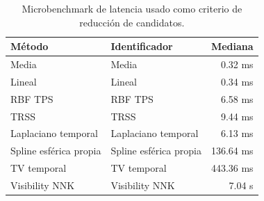 \begin{table}[htbp]
\centering
\small
\caption{Microbenchmark de latencia usado como criterio de reducción de candidatos.}
\label{tab:ch4_runtime_screening_summary}
\begin{tabular}{@{}p{4.0cm}p{3.3cm}r@{}}
\toprule
Método & Identificador & Mediana \\
\midrule
Media & Media & 0.32 ms \\
Lineal & Lineal & 0.34 ms \\
RBF TPS & RBF TPS & 6.58 ms \\
TRSS & TRSS & 9.44 ms \\
Laplaciano temporal & Laplaciano temporal & 6.13 ms \\
Spline esférica propia & Spline esférica propia & 136.64 ms \\
TV temporal & TV temporal & 443.36 ms \\
Visibility NNK & Visibility NNK & 7.04 s \\
\bottomrule
\end{tabular}
\end{table}
